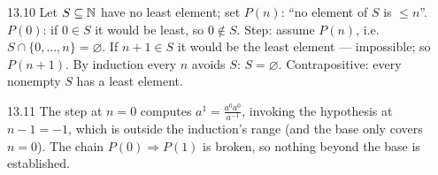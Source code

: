 \begin{solution}{13.10}
Let $S \subseteq \mathbb{N}$ have no least element; set $P(n)$: ``no element of $S$
is $\leq n$''. $P(0)$: if $0 \in S$ it would be least, so $0 \notin S$.
Step: assume $P(n)$, i.e.\ $S \cap \{0,\dots,n\} = \varnothing$. If
$n + 1 \in S$ it would be the least element --- impossible; so $P(n+1)$.
By induction every $n$ avoids $S$: $S = \varnothing$. Contrapositive: every
nonempty $S$ has a least element.
\end{solution}

\begin{solution}{13.11}
The step at $n = 0$ computes $a^{1} = \frac{a^0 a^0}{a^{-1}}$, invoking the
hypothesis at $n - 1 = -1$, which is outside the induction's range (and the
base only covers $n = 0$). The chain $P(0) \Rightarrow P(1)$ is broken, so
nothing beyond the base is established.
\end{solution}
